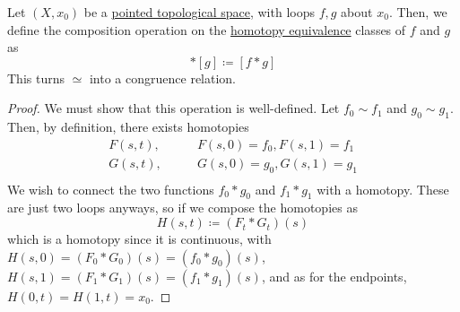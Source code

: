 	\begin{definition}
	  \label{def:homotopy-congruence-on-loops}
	  Let $(X, x_0)$ be a \hyperref[def:pointed-topological-space]{pointed topological space}, with loops $f, g$ about $x_0$. Then, we define the composition operation on the \hyperref[def:homotopy-equivalence]{homotopy equivalence} classes of $f$ and $g$ as
		\begin{equation}
			[f] \ast [g] \coloneqq [f \ast g]
	\end{equation}
		This turns $\simeq$ into a congruence relation. 
	\end{definition}
	\begin{proof}
	  We must show that this operation is well-defined. Let $f_0 \sim f_1$ and $g_0 \sim g_1$. Then, by definition, there exists homotopies 
		\begin{align}
			F(s, t), & \qquad F(s, 0) = f_0, F(s, 1) = f_1 \\ 
			G(s, t), & \qquad G(s, 0) = g_0, G(s, 1) = g_1 \\ 
		\end{align}
		We wish to connect the two functions $f_0 \ast g_0$ and $f_1 \ast g_1$ with a homotopy. These are just two loops anyways, so if we compose the homotopies as
		\begin{equation}
			H(s, t) \coloneqq (F_t \ast G_t) (s)
		\end{equation}
		which is a homotopy since it is continuous, with $H(s, 0) = (F_0 \ast G_0) (s) = (f_0 \ast g_0) (s)$, $H(s, 1) = (F_1 \ast G_1)(s) = (f_1 \ast g_1)(s)$, and as for the endpoints, $H(0, t) = H(1, t) = x_0$. 
	\end{proof}

